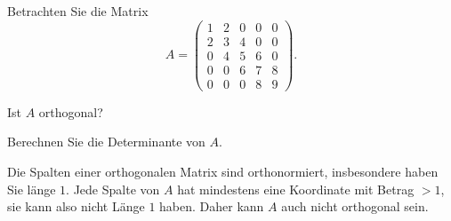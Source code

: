 Betrachten Sie die Matrix
\[
A=
\begin{pmatrix}
1&2&0&0&0\\
2&3&4&0&0\\
0&4&5&6&0\\
0&0&6&7&8\\
0&0&0&8&9
\end{pmatrix}.
\]
\begin{teilaufgaben}
\item Ist $A$ orthogonal?
\item Berechnen Sie die Determinante von $A$.
\end{teilaufgaben}

\begin{loesung}
\begin{teilaufgaben}
\item
Die Spalten einer orthogonalen Matrix sind orthonormiert,
insbesondere haben Sie länge $1$. Jede Spalte von $A$ hat mindestens eine
Koordinate mit Betrag $>1$, sie kann also nicht Länge $1$ haben.
Daher kann $A$ auch nicht orthogonal sein.


\end{teilaufgaben}
\end{loesung}
